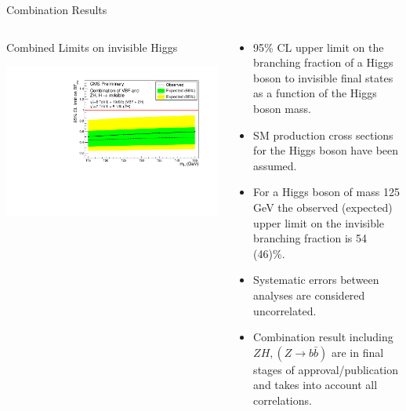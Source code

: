 \documentclass[8pt]{beamer}
\begin{document}
\begin{frame}{Combination Results}
  
\begin{columns}
 
\begin{block}{Combined Limits on invisible Higgs}
 
\centering
\includegraphics[width=\linewidth]{img/invlimitfinal.pdf} 

\end{block}

\begin{block}

\begin{itemize}
 \item 95\% CL upper limit on the branching fraction of a Higgs boson to invisible final states as a function of the Higgs boson mass.
 \item SM production cross sections for the Higgs boson have been assumed.
 \item For a Higgs boson of mass 125 GeV the observed (expected) upper limit on the invisible branching fraction is 54 (46)\%.
 \item Systematic errors between analyses are considered uncorrelated.
 \item Combination result including $ZH, (Z \rightarrow b\bar{b})$ are in final stages of approval/publication and takes into account all correlations.
\end{itemize}
 
\end{block}

\end{columns}
 
\end{frame}
\end{document}
